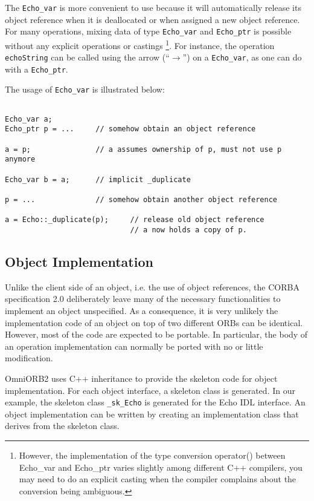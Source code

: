 \documentclass[11pt,twoside,onecolumn]{book}
\begin{document}
The {\tt Echo\_var} is more convenient to use because it will automatically
release its object reference when it is deallocated or when assigned a new
object reference. For many operations, mixing data of type {\tt Echo\_var} and
{\tt Echo\_ptr} is possible without any explicit operations or castings
\footnote{However, the implementation of the type conversion operator()
between Echo\_var and Echo\_ptr varies slightly among different C++
compilers, you may need to do an explicit casting when the compiler
complains about the conversion being ambiguous.}. For instance, the
operation {\tt echoString} can be called using the arrow
(``$\rightarrow$'') on a {\tt Echo\_var}, as one can do with a {\tt Echo\_ptr}.

The usage of {\tt Echo\_var} is illustrated below:

{\small
\begin{verbatim}

Echo_var a;
Echo_ptr p = ...     // somehow obtain an object reference

a = p;               // a assumes ownership of p, must not use p anymore

Echo_var b = a;      // implicit _duplicate

p = ...              // somehow obtain another object reference

a = Echo::_duplicate(p);     // release old object reference
                             // a now holds a copy of p.
\end{verbatim}
}

\subsection{Object Implementation}
\label{stubobjimpl}

Unlike the client side of an object, i.e. the use of object references, the
CORBA specification 2.0 deliberately leave many of the necessary
functionalities to implement an object unspecified. As a consequence, it is
very unlikely the implementation code of an object on top of two different
ORBs can be identical. However, most of the code are expected to be
portable. In particular, the body of an operation implementation can
normally be ported with no or little modification.

OmniORB2 uses C++ inheritance to provide the skeleton code for 
object implementation. For each object interface, a skeleton class is
generated. In our example, the skeleton class {\tt \_sk\_Echo} is generated for
the Echo IDL interface. An object implementation can be written by creating
an implementation class that derives from the skeleton class. 
\end{document}
